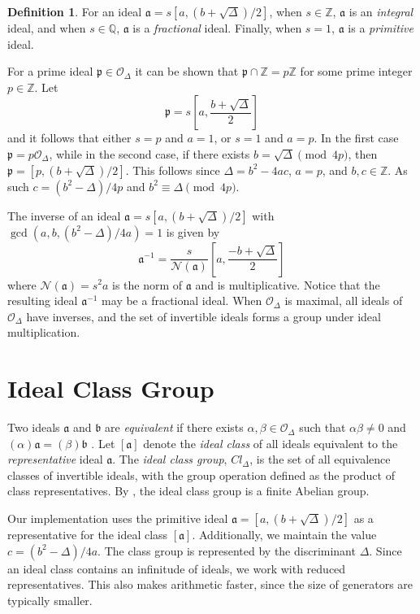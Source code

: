 \documentclass{ucalgthes1}
\theoremstyle{definition}
\newtheorem{defn}[thm]{Definition}
\newcommand{\OO}{\mathcal{O}}
\newcommand{\ZZ}{\mathbb{Z}}
\newcommand{\QQ}{\mathbb{Q}}
\newcommand{\ideal}{\mathfrak}
\newcommand{\idealclass}[1]{\left[ \ideal #1 \right]}
\newcommand{\aclass}{\idealclass a}
\begin{document}
\begin{defn}
For an ideal $\ideal a = s [a, (b + \sqrt\Delta)/2]$, when $s \in \ZZ$, $\ideal a$ is an \emph{integral} ideal, and when $s \in \QQ$, $\ideal a$ is a \emph{fractional} ideal.  Finally, when $s = 1$, $\ideal a$ is a \emph{primitive} ideal.
\end{defn}

For a prime ideal $\ideal p \in \OO_\Delta$ it can be shown \cite[p.19]{Jacobson1999} that $\ideal p \cap \ZZ = p\ZZ$ for some prime integer $p \in \ZZ$. Let
\[
	\ideal p = s\left[a, \frac{b + \sqrt{\Delta}}{2}\right]
\]
and it follows that either $s=p$ and $a=1$, or $s=1$ and $a=p$.  In the first case $\ideal p = p\OO_\Delta$, while in the second case, if there exists $b = \sqrt{\Delta} \pmod {4p}$, then $\ideal p = [p, (b + \sqrt{\Delta})/2]$.  This follows since $\Delta = b^2-4ac$, $a = p$, and $b, c \in \ZZ$. As such $c = (b^2-\Delta)/4p$ and \mbox{$b^2 \equiv \Delta \pmod {4p}$}.

The inverse of an ideal $\ideal a = s[a, (b + \sqrt\Delta)/2]$ with $\gcd(a, b, (b^2 - \Delta)/4a) = 1$ is given by \cite[pp.14--15]{Jacobson1999}
\[
	{\ideal a}^{-1} = \frac{s}{\mathcal N(\mathfrak a)} \left[a, \frac{-b+\sqrt{\Delta}}{2} \right]
\]
where $\mathcal N(\ideal a) = s^2a$ is the norm of $\ideal a$ and is multiplicative. Notice that the resulting ideal $\ideal a^{-1}$ may be a fractional ideal.  When $\OO_\Delta$ is maximal, all ideals of $\OO_\Delta$ have inverses, and the set of invertible ideals forms a group under ideal multiplication.


\section{Ideal Class Group}

Two ideals $\ideal a$ and $\ideal b$ are \emph{equivalent} if there exists $\alpha, \beta \in \OO_\Delta$ such that $\alpha \beta \neq 0$ and \mbox{$(\alpha)\ideal a = (\beta) \ideal b$} \cite[p.88]{Jacobson2009}.  Let $[\mathfrak a]$ denote the \emph{ideal class} of all ideals equivalent to the \emph{representative} ideal $\ideal a$. The \emph{ideal class group}, $Cl_\Delta$, is the set of all equivalence classes of invertible ideals, with the group operation defined as the product of class representatives. By \cite[p.136]{Cohn1980}, the ideal class group is a finite Abelian group.

Our implementation uses the primitive ideal $\ideal a = [a, (b + \sqrt\Delta)/2]$ as a representative for the ideal class $\aclass$.  Additionally, we maintain the value $c = (b^2 - \Delta)/4a$.  The class group is represented by the discriminant $\Delta$.  Since an ideal class contains an infinitude of ideals, we work with reduced representatives.  This also makes arithmetic faster, since the size of generators are typically smaller.
\end{document}
